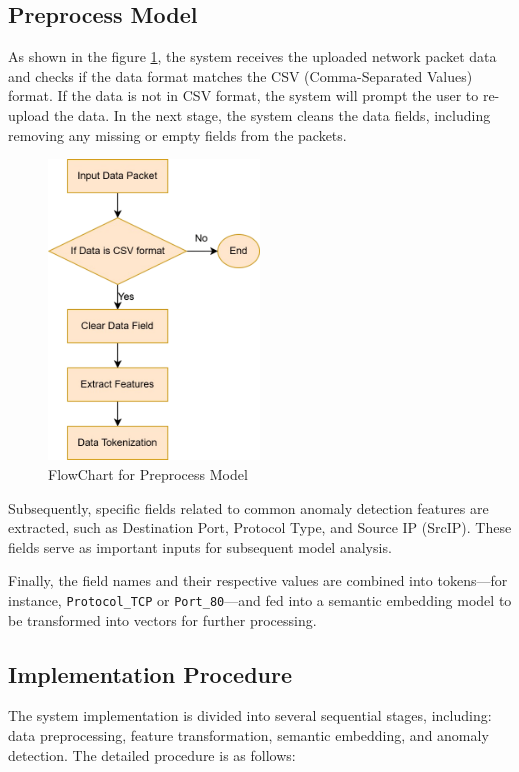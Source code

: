 \begin{ZhChapter}
\subsection{Preprocess Model}
As shown in the figure \ref{fig:FlowChart}, the system receives the uploaded network packet data and checks if the data format matches the CSV (Comma-Separated Values) format. If the data is not in CSV format, the system will prompt the user to re-upload the data. In the next stage, the system cleans the data fields, including removing any missing or empty fields from the packets.
\begin{figure}[htbp]
    \centering
    \includegraphics[width = 0.5\textwidth]{image/FlowChart.jpg}
    \caption{FlowChart for Preprocess Model}
    \label{fig:FlowChart}
\end{figure}

Subsequently, specific fields related to common anomaly detection features are extracted, such as Destination Port, Protocol Type, and Source IP (SrcIP). These fields serve as important inputs for subsequent model analysis.

Finally, the field names and their respective values are combined into tokens---for instance, \texttt{Protocol\_TCP} or \texttt{Port\_80}---and fed into a semantic embedding model to be transformed into vectors for further processing.



\subsection{Implementation Procedure}
The system implementation is divided into several sequential stages, including: data preprocessing, feature transformation, semantic embedding, and anomaly detection. The detailed procedure is as follows:


\end{ZhChapter}
